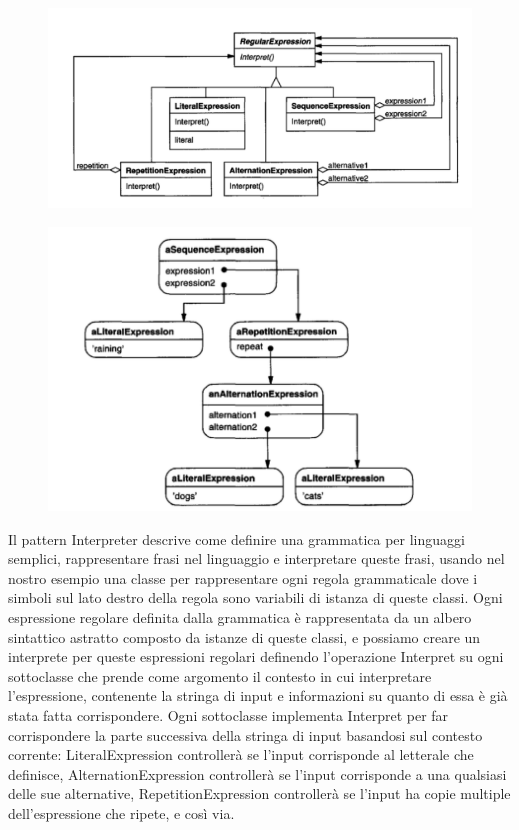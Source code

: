 \begin{multicols}{2}
    \begin{figure}[H]
        \centering
        \includegraphics[width=1\linewidth]{assets/pattern/interpreter/interpreter-esempio-class.png}
    \end{figure}
    \columnbreak
    \begin{figure}[H]
        \centering
        \includegraphics[width=1\linewidth]{assets/pattern/interpreter/interpreter-esempio-object.png}
    \end{figure}
\end{multicols}

Il pattern Interpreter descrive come definire una grammatica per linguaggi semplici, rappresentare frasi nel linguaggio e interpretare queste frasi, usando nel nostro esempio una classe per rappresentare ogni regola grammaticale dove i simboli sul lato destro della regola sono variabili di istanza di queste classi. Ogni espressione regolare definita dalla grammatica è rappresentata da un albero sintattico astratto composto da istanze di queste classi, e possiamo creare un interprete per queste espressioni regolari definendo l'operazione Interpret su ogni sottoclasse che prende come argomento il contesto in cui interpretare l'espressione, contenente la stringa di input e informazioni su quanto di essa è già stata fatta corrispondere. Ogni sottoclasse implementa Interpret per far corrispondere la parte successiva della stringa di input basandosi sul contesto corrente: LiteralExpression controllerà se l'input corrisponde al letterale che definisce, AlternationExpression controllerà se l'input corrisponde a una qualsiasi delle sue alternative, RepetitionExpression controllerà se l'input ha copie multiple dell'espressione che ripete, e così via.

